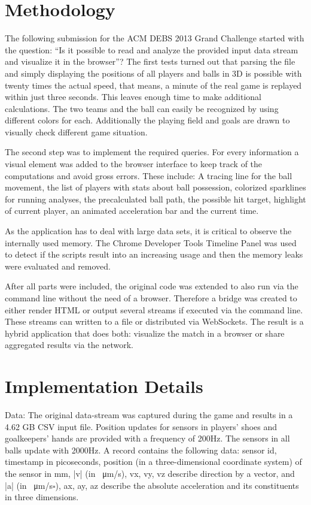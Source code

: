 \documentclass{sig-alternate}
\begin{document}
\section{Methodology}

The following submission for the ACM DEBS 2013 Grand Challenge
started with the question: ``Is it possible to read and analyze
the provided input data stream and visualize it in the browser''?
The first tests turned out that parsing the file
and simply displaying the positions of all players
and balls in 3D is possible with twenty times the actual speed,
that means, a minute of the real game is replayed
within just three seconds.
This leaves enough time to make additional calculations.
The two teams and the ball can easily be recognized
by using different colors for each.
Additionally the playing field and goals are drawn
to visually check different game situation.

The second step was to implement the required queries.
For every information a visual element was added
to the browser interface to keep track of the computations
and avoid gross errors.
These include: A tracing line for the ball movement,
the list of players with stats about ball possession,
colorized sparklines for running analyses,
the precalculated ball path, the possible hit target,
highlight of current player, an animated acceleration bar
and the current time.

As the application has to deal with large data sets,
it is critical to observe the internally used memory.
The Chrome Developer Tools Timeline Panel was used
to detect if the scripts result into an increasing usage
and then the memory leaks were evaluated and removed.

After all parts were included, the original code
was extended to also run via the command line
without the need of a browser.
Therefore a bridge was created to either render HTML
or output several streams if executed via the command line.
These streams can written to a file or distributed via WebSockets.
The result is a hybrid application that does both:
visualize the match in a browser or share aggregated results
via the network.

\section{Implementation Details}

Data: The original data-stream was captured during the game
and results in a 4.62 GB CSV input file.
Position updates for sensors in players’ shoes
and goalkeepers’ hands are provided with a frequency of 200Hz.
The sensors in all balls update with 2000Hz.
A record contains the following data:
sensor id, timestamp in picoseconds, position
(in a three-dimensional coordinate system) of the sensor
in mm, |v| (in \SI{}{\micro\metre}/s), vx, vy, vz
describe direction by a vector,
and |a| (in \SI{}{\micro\metre}/s$\square$), ax, ay, az describe the absolute acceleration
and its constituents in three dimensions.
\end{document}
